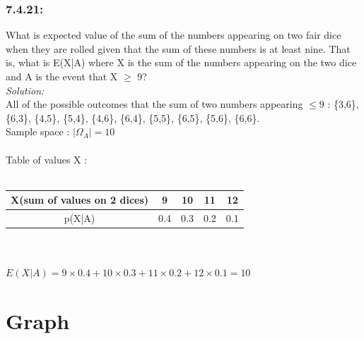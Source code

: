 \documentclass[a4paper]{article}
\begin{document}
	
	\subsubsection*{7.4.21:}
	What is expected value of the sum of the numbers appearing on two fair dice when they are rolled given that the sum of these numbers is at least nine. That is, what is E(X|A) where X is the sum of the numbers appearing on the two dice and A is the event that X $\geq$ 9? \\
	\textit{Solution:}\\
	All of the possible outcomes that the sum of two numbers appearing $\leq 9$ : \{3,6\}, \{6,3\}, \{4,5\}, \{5,4\}, \{4,6\}, \{6,4\}, \{5,5\}, \{6,5\}, \{5,6\}, \{6,6\}.\\
	Sample space : $|\Omega_A| = 10$ \\ \\
	Table of values X : \\ \\
	\begin{tabular}{|c|c|c|c|c|}
		\hline
		X(sum of values on 2 dices) & 9   & 10  & 11  & 12  \\
		\hline
		p(X|A)                      & 0.4 & 0.3 & 0.2 & 0.1 \\
		\hline
	\end{tabular}
	\\ \\
$E(X|A) = 9\times0.4 + 10\times0.3 + 11\times0.2 + 12\times 0.1 = 10$                                 \\
	
	\newpage
	\section*{Graph}
\end{document}
